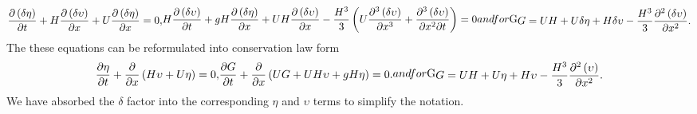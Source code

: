 \begin{subequations}
	\begin{gather}
		\label{eqn:LinCont}
		\frac{\partial  \left(\delta\eta \right)}{\partial  t} + H\frac{\partial  \left(\delta\upsilon \right)}{\partial  x} + U\frac{\partial  \left(\delta\eta \right)}{\partial  x}  = 0,
	\end{gather}
	\begin{gather}
	\label{eqn:LineMome}
	H\frac{\partial  \left(\delta\upsilon \right)}{\partial  t} + gH\frac{\partial  \left(\delta\eta \right)}{\partial  x} + UH\frac{\partial  \left(\delta\upsilon \right)}{\partial  x} - \frac{H^3}{3}\left(U\frac{\partial^3  \left(\delta\upsilon \right)}{\partial  x^3} + \frac{\partial^3  \left(\delta\upsilon \right)}{\partial  x^2 \partial  t}  \right)  = 0
	\end{gather}
\label{eqn:LinSerre}	
and for $G$
\begin{gather}
	G = UH + U \delta \eta + H \delta \upsilon -\frac{H^3}{3} \frac{\partial^2 \left(\delta\upsilon \right)}{\partial x^2}.
	\label{eqn:LinConSerre}
\end{gather}	
\end{subequations}
The these equations can be reformulated  into conservation law form
\begin{subequations}
	\begin{gather}
	\label{eqn:LinContG}
	\frac{\partial  \eta}{\partial  t} +\frac{\partial}{\partial  x} \left(H\upsilon + U \eta\right) = 0,
	\end{gather}
	\begin{gather}
	\label{eqn:LineMomeG}
	\frac{\partial  G}{\partial  t} + \frac{\partial}{\partial  x}\left(UG + UH\upsilon + gH \eta\right) = 0.
	\end{gather}
	and for $G$
	\begin{gather}
	G = UH + U \eta + H \upsilon -\frac{H^3}{3} \frac{\partial^2 \left(\upsilon \right)}{\partial x^2}.
	\label{eqn:LinConSerreG}
	\end{gather}
	\label{eqn:LinSerreG}	
\end{subequations}
We have absorbed the $\delta$ factor into the corresponding $\eta$ and $\upsilon$ terms to simplify the notation.

